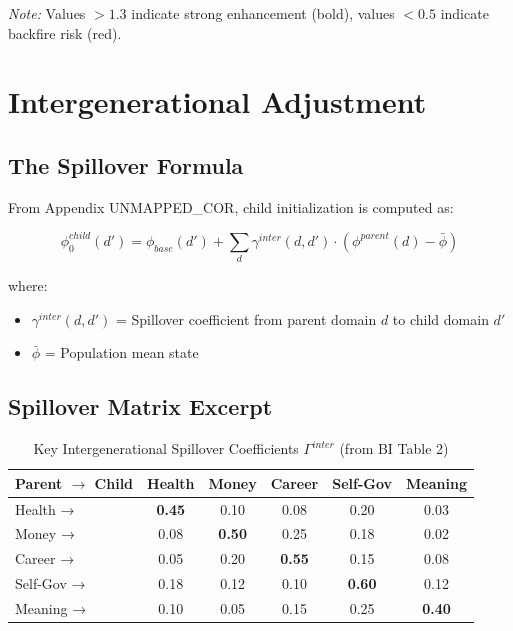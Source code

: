 \textit{Note:} Values $> 1.3$ indicate strong enhancement (bold), values $< 0.5$ indicate backfire risk (red).


\section{Intergenerational Adjustment}
\label{sec:calc-intergenerational}

\subsection{The Spillover Formula}

From Appendix UNMAPPED_COR, child initialization is computed as:

\begin{equation}
\boxed{
\phi_0^{child}(d') = \phi_{base}(d') + \sum_d \gamma^{inter}(d, d') \cdot (\phi^{parent}(d) - \bar{\phi})
}
\label{eq:spillover}
\end{equation}

where:
\begin{itemize}
\item $\gamma^{inter}(d, d')$ = Spillover coefficient from parent domain $d$ to child domain $d'$
\item $\bar{\phi}$ = Population mean state
\end{itemize}

\subsection{Spillover Matrix Excerpt}

\begin{table}[htbp]
\centering
\caption{Key Intergenerational Spillover Coefficients $\Gamma^{inter}$ (from BI Table 2)}
\label{tab:spillover-excerpt}
\renewcommand{\arraystretch}{1.2}
\begin{tabular}{@{}l|ccccc@{}}
\toprule
\textbf{Parent $\rightarrow$ Child} & Health & Money & Career & Self-Gov & Meaning \\
\midrule
Health → & \textbf{0.45} & 0.10 & 0.08 & 0.20 & 0.03 \\
Money → & 0.08 & \textbf{0.50} & 0.25 & 0.18 & 0.02 \\
Career → & 0.05 & 0.20 & \textbf{0.55} & 0.15 & 0.08 \\
Self-Gov → & 0.18 & 0.12 & 0.10 & \textbf{0.60} & 0.12 \\
Meaning → & 0.10 & 0.05 & 0.15 & 0.25 & \textbf{0.40} \\
\bottomrule
\end{tabular}
\end{table}

